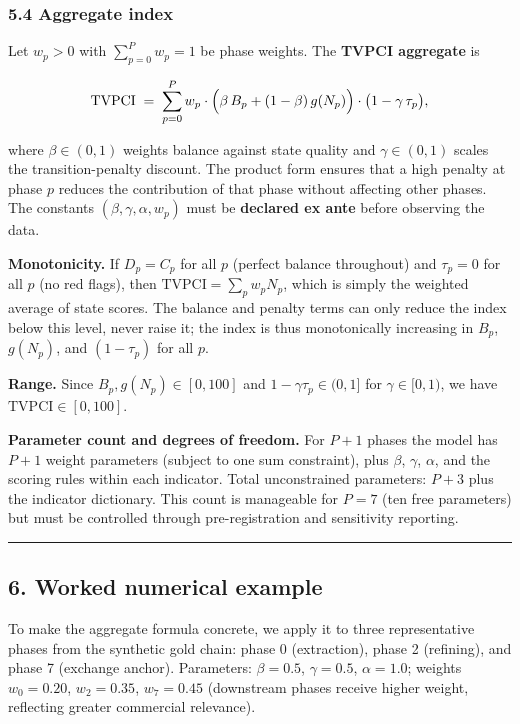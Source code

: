 \documentclass[
  11pt,
  letterpaper,
]{article}
\begin{document}
\subsubsection{5.4 Aggregate index}\label{aggregate-index}

Let \(w_p > 0\) with \(\sum_{p=0}^{P} w_p = 1\) be phase weights. The
\textbf{TVPCI aggregate} is

\[\mathrm{TVPCI} \;=\; \sum_{p=0}^{P} w_p \cdot \Bigl(\beta \, B_p + (1-\beta)\,g(N_p)\Bigr) \cdot \bigl(1 - \gamma \, \tau_p\bigr),\]

where \(\beta \in (0,1)\) weights balance against state quality and
\(\gamma \in (0,1)\) scales the transition-penalty discount. The product
form ensures that a high penalty at phase \(p\) reduces the contribution
of that phase without affecting other phases. The constants
\((\beta, \gamma, \alpha, w_p)\) must be \textbf{declared ex ante}
before observing the data.

\textbf{Monotonicity.} If \(D_p = C_p\) for all \(p\) (perfect balance
throughout) and \(\tau_p = 0\) for all \(p\) (no red flags), then
\(\mathrm{TVPCI} = \sum_p w_p N_p\), which is simply the weighted
average of state scores. The balance and penalty terms can only reduce
the index below this level, never raise it; the index is thus
monotonically increasing in \(B_p\), \(g(N_p)\), and \((1-\tau_p)\) for
all \(p\).

\textbf{Range.} Since \(B_p, g(N_p) \in [0,100]\) and
\(1 - \gamma \tau_p \in (0,1]\) for \(\gamma \in [0,1)\), we have
\(\mathrm{TVPCI} \in [0,100]\).

\textbf{Parameter count and degrees of freedom.} For \(P+1\) phases the
model has \(P+1\) weight parameters (subject to one sum constraint),
plus \(\beta\), \(\gamma\), \(\alpha\), and the scoring rules within
each indicator. Total unconstrained parameters: \(P + 3\) plus the
indicator dictionary. This count is manageable for \(P = 7\) (ten free
parameters) but must be controlled through pre-registration and
sensitivity reporting.

\begin{center}\rule{0.5\linewidth}{0.5pt}\end{center}

\subsection{6. Worked numerical example}\label{worked-numerical-example}

To make the aggregate formula concrete, we apply it to three
representative phases from the synthetic gold chain: phase 0
(extraction), phase 2 (refining), and phase 7 (exchange anchor).
Parameters: \(\beta = 0.5\), \(\gamma = 0.5\), \(\alpha = 1.0\); weights
\(w_0 = 0.20\), \(w_2 = 0.35\), \(w_7 = 0.45\) (downstream phases
receive higher weight, reflecting greater commercial relevance).
\end{document}
